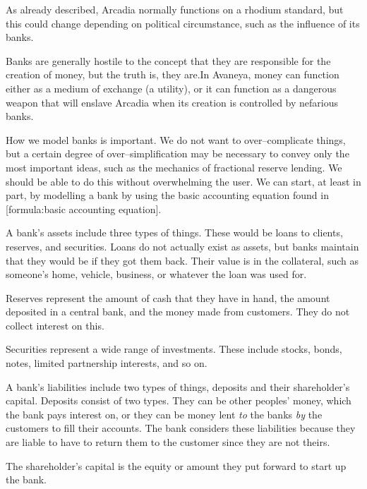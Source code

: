
As already described, Arcadia normally functions on a rhodium standard, but this could change depending on political circumstance, such as the influence of its banks.

Banks are generally hostile to the concept that they are responsible for the creation of money, but the truth is, they are. In Avaneya, money can function either as a medium of exchange (a utility), or it can function as a dangerous weapon that will enslave Arcadia when its creation is controlled by nefarious banks.

How we model banks is important. We do not want to over--complicate things, but a certain degree of over--simplification may be necessary to convey only the most important ideas, such as the mechanics of fractional reserve lending. We should be able to do this without overwhelming the user. We can start, at least in part, by modelling a bank by using the basic accounting equation found in [formula:basic accounting equation].

\crlf
{}
\startformula
{}
\stopformula
\crlf

A bank's assets include three types of things. These would be loans to clients, reserves, and securities. Loans do not actually exist as assets, but banks maintain that they would be if they got them back. Their value is in the collateral, such as someone's home, vehicle, business, or whatever the loan was used for.

Reserves represent the amount of cash that they have in hand, the amount deposited in a central bank, and the money made from customers. They do not collect interest on this. 

Securities represent a wide range of investments. These include stocks, bonds, notes, limited partnership interests, and so on.

A bank's liabilities include two types of things, deposits and their shareholder's capital. Deposits consist of two types. They can be other peoples' money, which the bank pays interest on, or they can be money lent {\it to} the banks {\it by} the customers to fill their accounts. The bank considers these liabilities because they are liable to have to return them to the customer since they are not theirs.

The shareholder's capital is the equity or amount they put forward to start up the bank.


